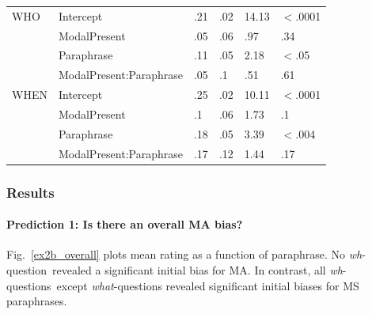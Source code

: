 \documentclass[12pt,letterpaper,table,svgnames,dvipsnames]{article}
\newcommand{\figref}[1]{Fig.~\ref{#1}}
\newcommand{\whq}{\emph{wh}-question~}
\newcommand{\whqs}{\emph{wh}-questions~}
\begin{document}
\begin{table}
\begin{center}
\begin{tabular}{llllll}
\midrule
WHO & Intercept & .21 & .02 & 14.13 & $<$.0001\\
{} & ModalPresent & .05 & .06 & .97 & .34\\
{} & Paraphrase & .11 & .05 & 2.18 & $<$.05\\
{} & ModalPresent:Paraphrase & .05 & .1 & .51 & .61\\
\midrule
WHEN & Intercept & .25 & .02 & 10.11 & $<$.0001\\
{} & ModalPresent & .1 & .06 & 1.73 & .1\\
{} & Paraphrase & .18 & .05 & 3.39 & $<$.004\\
{} & ModalPresent:Paraphrase & .17 & .12 & 1.44 & .17\\
\bottomrule
\end{tabular} 
\end{center} 
\end{table}



\subsubsection{Results}





\paragraph{Prediction 1: Is there an overall MA bias?}
\figref{ex2b_overall} plots mean rating as a function of paraphrase. No \whq revealed a significant initial bias for MA. In contrast, all \whqs except \emph{what}-questions revealed significant initial biases for MS paraphrases. 
\end{document}
